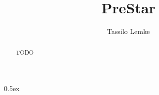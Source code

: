 \documentclass[11pt,a4paper]{article}
\begin{document}
\title{PreStar}
\author{Tassilo Lemke}
\maketitle

\begin{abstract}
  TODO
\end{abstract}

\newpage
\tableofcontents

\parindent 0pt\parskip 0.5ex

\newpage


%
%
\end{document}
